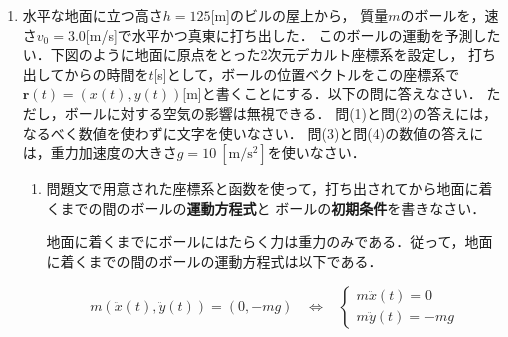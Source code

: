 \documentclass[a4paper,11pt]{ltjsarticle}
\begin{document}
\pagestyle{fancy}
\cfoot{\thepage}

\begin{enumerate}
    \item 水平な地面に立つ高さ$h=125$[m]のビルの屋上から，
    質量$m$のボールを，速さ$v_0=3.0$[m/s]で水平かつ真東に打ち出した．
    このボールの運動を予測したい．下図のように地面に原点をとった2次元デカルト座標系を設定し，
    打ち出してからの時間を$t$[s]として，ボールの位置ベクトルをこの座標系で
    $\bm{r}(t)=(x(t),y(t))$[m]と書くことにする．以下の問に答えなさい．
    ただし，ボールに対する空気の影響は無視できる．
    問(1)と問(2)の答えには，なるべく数値を使わずに文字を使いなさい．
    問(3)と問(4)の数値の答えには，重力加速度の大きさ$g=10\ [\mathrm{m/s^2}]$を使いなさい．

    \begin{center}
    \end{center}
    
    \begin{enumerate}[label=(\arabic*)]
        \item 問題文で用意された座標系と函数を使って，打ち出されてから地面に着くまでの間のボールの\textbf{運動方程式}と
        ボールの\textbf{初期条件}を書きなさい．

        \vspace{5pt}        

        地面に着くまでにボールにはたらく力は重力のみである．従って，地面に着くまでの間のボールの運動方程式は以下である．

        \begin{equation*}
            m(\ddot{x}(t),\ddot{y}(t))=(0,-mg) \hspace{10pt} \Leftrightarrow \hspace{10pt}
            \begin{cases}
                m \ddot{x}(t)=0 \\
                m \ddot{y}(t)=-mg
            \end{cases}
        \end{equation*}


\end{enumerate}
\end{enumerate}
\end{document}
